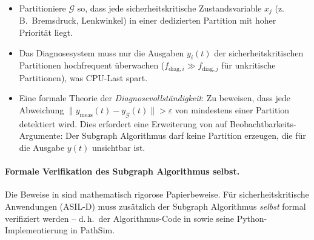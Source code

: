 ﻿\documentclass[12pt,a4paper]{article}
\theoremstyle{definition}
\begin{document}
\begin{itemize}[nosep]
  \item Partitioniere $\mathcal{G}$ so, dass jede sicherheitskritische
        Zustandsvariable $x_j$ (z.\,B.\ Bremsdruck, Lenkwinkel) in
        einer dedizierten Partition mit hoher Priorität liegt.

  \item Das Diagnosesystem muss nur die Ausgaben $y_i(t)$ der
        sicherheitskritischen Partitionen hochfrequent überwachen
        ($f_{\mathrm{diag},i} \gg f_{\mathrm{diag},j}$ für unkritische
        Partitionen), was CPU-Last spart.

  \item Eine formale Theorie der \emph{Diagnosevollständigkeit}: Zu beweisen,
        dass jede Abweichung $\|y_{\mathrm{meas}}(t) - y_{\mathcal{G}}(t)\|
        > \varepsilon$ von mindestens einer Partition detektiert wird.
        Dies erfordert eine Erweiterung von  auf
        Beobachtbarkeits-Argumente: Der Subgraph Algorithmus darf keine
        Partition erzeugen, die für die Ausgabe $y(t)$ unsichtbar ist.
\end{itemize}

\paragraph{Formale Verifikation des Subgraph Algorithmus selbst.}
Die Beweise in  sind mathematisch rigorose
Papierbeweise. Für sicherheitskritische Anwendungen (ASIL-D)
muss zusätzlich der Subgraph Algorithmus \emph{selbst}
formal verifiziert werden -- d.\,h.\ der Algorithmus-Code in
 sowie seine Python-Implementierung in PathSim.
\end{document}
